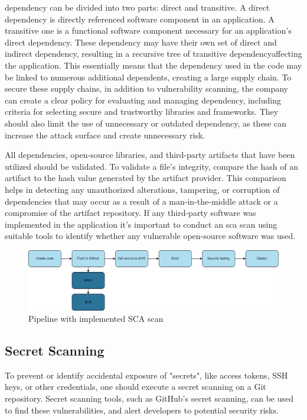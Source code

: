 \gls{dependency} can be divided into two parts: direct and transitive. A direct dependency is directly referenced software component in an application. A transitive one is a functional software component necessary for an application's direct \gls{dependency}. These \gls{dependency} may have their own set of direct and indirect \gls{dependency}, resulting in a recursive tree of transitive \gls{dependency}affecting the application. This essentially means that the \gls{dependency} used in the code may be linked to numerous additional dependents, creating a large supply chain. To secure these supply chains, in addition to vulnerability scanning, the company can create a clear policy for evaluating and managing \gls{dependency}, including criteria for selecting secure and trustworthy libraries and frameworks. They should also limit the use of unnecessary or outdated \gls{dependency}, as these can increase the attack surface and create unnecessary risk. \cite{googledependency}

All dependencies, open-source libraries, and third-party \gls{artifact}s that have been utilized should be validated. To validate a file's integrity, compare the hash of an artifact to the hash value generated by the artifact provider. This comparison helps in detecting any unauthorized alterations, tampering, or corruption of dependencies that may occur as a result of a man-in-the-middle attack or a compromise of the artifact repository. If any third-party software was implemented in the application it's important to conduct an \acrshort{sca} scan using suitable tools to identify whether any vulnerable open-source software was used. \cite{bestpracticeSupplyChain}


\vspace{2mm}
\begin{figure}[H]
    \centering
    \includegraphics[width=0.8\columnwidth]{Images/pipeline3.png}
    \caption{Pipeline with implemented SCA scan}
    \label{fig: Pipeline with implemented SCA scan}
\end{figure}

\subsection{Secret Scanning}
To prevent or identify accidental exposure of "secrets", like access tokens, SSH keys, or other credentials, one should execute a secret scanning on a Git repository. Secret scanning tools, such as GitHub's secret scanning, can be used to find these vulnerabilities, and alert developers to potential security risks. \cite{GithubSecretScanning}

